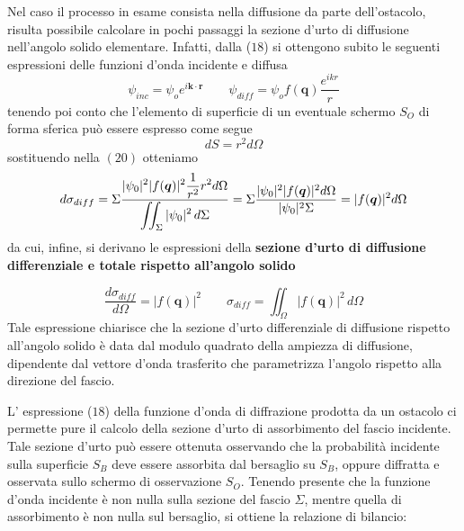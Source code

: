 Nel caso il processo in esame consista nella diffusione da parte dell'ostacolo, risulta possibile calcolare in pochi passaggi la sezione d'urto di diffusione nell'angolo solido elementare.
Infatti, dalla ($18$) si ottengono subito le seguenti espressioni delle funzioni d'onda incidente e diffusa \[
	\psi_{inc} = \psi_o e^{i \bm{k} \cdot \bm{r}} \qquad
	\psi_{diff} = \psi_o f(\bm{q})\frac{e^{ikr}}{r}
\] tenendo poi conto che l'elemento di superficie di un eventuale schermo $S_O$ di forma sferica può essere espresso come segue \[
	dS = r^2 d \Omega
\] sostituendo nella $(20)$ otteniamo \[
	d \sigma_{diff} = \Sigma \fraclarg{|\psi_0|^2|f(\bm{q})|^2\frac{1}{r^2}r^2 d \Omega}{\iint_{\Sigma}|\psi_0|^2 \, d \Sigma}
	= \Sigma \frac{|\psi_0|^2|f(\bm{q})|^2 d \Omega}{|\psi_0|^2 \Sigma}
	= |f(\bm{q})|^2 d \Omega
\]
da cui, infine, si derivano le espressioni della \textbf{sezione d'urto di diffusione differenziale e totale rispetto all'angolo solido}

\begin{equation}
	\frac{d \sigma_{diff}}{d \Omega} = |f(\bm{q})|^2 \qquad
	\sigma_{diff} = \iint_{\Omega}|f(\bm{q})|^2 \, d \Omega
\end{equation} Tale espressione chiarisce che la sezione d'urto differenziale di diffusione rispetto all'angolo solido è data dal modulo quadrato della ampiezza di diffusione, dipendente dal vettore d'onda trasferito che parametrizza l'angolo rispetto alla direzione del fascio.

L' espressione ($18$) della funzione d'onda di diffrazione prodotta da un ostacolo ci permette pure il calcolo della sezione d'urto di assorbimento del fascio incidente.
Tale sezione d'urto può essere ottenuta osservando che la probabilità incidente sulla superficie $S_B$ deve essere assorbita dal bersaglio su $S_B$, oppure diffratta e osservata sullo schermo di osservazione $S_O$.
Tenendo presente che la funzione d'onda incidente è non nulla sulla sezione del fascio $\Sigma$, mentre quella di assorbimento è non nulla sul bersaglio, si ottiene la relazione di bilancio:

